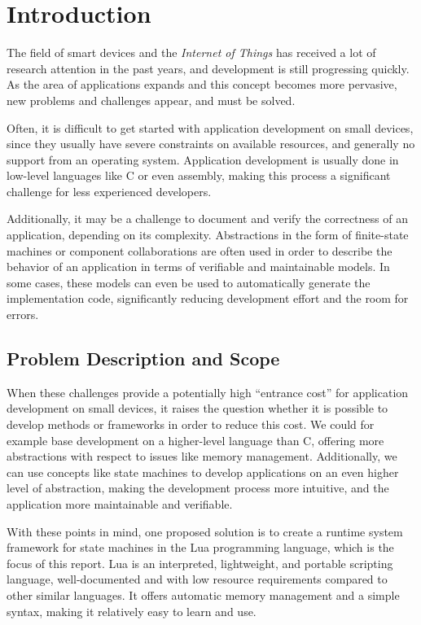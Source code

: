 \chapter{Introduction}
\label{ch:intro}
The field of smart devices and the \emph{Internet of Things} has received a lot of research attention in the past years, and development is still progressing quickly. As the area of applications expands and this concept becomes more pervasive, new problems and challenges appear, and must be solved.

\noindent
Often, it is difficult to get started with application development on small devices, since they usually have severe constraints on available resources, and generally no support from an operating system. Application development is usually done in low-level languages like C or even assembly, making this process a significant challenge for less experienced developers.

\noindent
Additionally, it may be a challenge to document and verify the correctness of an application, depending on its complexity. Abstractions in the form of finite-state machines or component collaborations are often used in order to describe the behavior of an application in terms of verifiable and maintainable models. In some cases, these models can even be used to automatically generate the implementation code, significantly reducing development effort and the room for errors.

\section{Problem Description and Scope}
\label{sec:problem_scope}
\noindent
When these challenges provide a potentially high ``entrance cost'' for application development on small devices, it raises the question whether it is possible to develop methods or frameworks in order to reduce this cost. We could for example base development on a higher-level language than C, offering more abstractions with respect to issues like memory management. Additionally, we can use concepts like state machines to develop applications on an even higher level of abstraction, making the development process more intuitive, and the application more maintainable and verifiable.

\noindent
With these points in mind, one proposed solution is to create a runtime system framework for state machines in the Lua programming language, which is the focus of this report. Lua is an interpreted, lightweight, and portable scripting language, well-documented and with low resource requirements compared to other similar languages. It offers automatic memory management and a simple syntax, making it relatively easy to learn and use.

